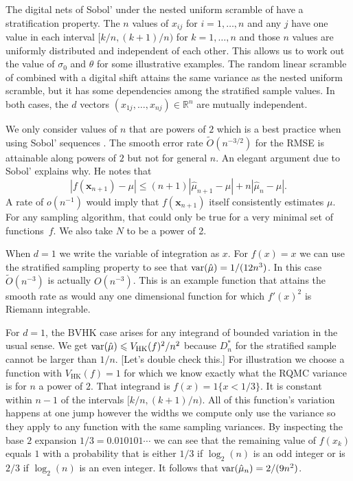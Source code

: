 \documentclass{article}
\newcommand{\art}[1]{\begingroup\color{blue}#1\endgroup}
\renewcommand{\le}{\leqslant}
\newcommand{\real}{\mathbb{R}}
\newcommand{\bsx}{\boldsymbol{x}}
\newcommand{\hk}{\mathrm{HK}}
\begin{document}
The digital nets of Sobol' \cite{Sob67} under the nested
uniform scramble of \cite{Owe95} have a stratification
property.  The $n$ values of $x_{ij}$ for $i=1,\dots,n$
and any $j$ have one value in each interval $[k/n,(k+1)/n)$
for $k=1,\dots,n$ and those $n$ values are uniformly distributed
and independent of each other. This allows us to work out
the value of $\sigma_0$ and $\theta$ for some illustrative
examples.  The random linear scramble of \cite{Mat98} combined
with a digital shift attains the same variance as the nested
uniform scramble, but it has some dependencies among the stratified
sample values.  In both cases, the $d$ vectors $(x_{1j},
\dots,x_{nj})\in\real^n$ are mutually independent.

We only consider values of $n$ that are powers of $2$
which is a best practice when using Sobol' sequences \cite{Owe22a}.
The smooth error rate $\tilde O(n^{-3/2})$ for the RMSE
is attainable along powers of $2$
but not for general $n$. An elegant argument due
to Sobol' \cite{sobo:1998} explains why.
He notes that
$$
|f(\bsx_{n+1})-\mu|
\le (n+1)|\hat\mu_{n+1}-\mu|+n|\hat\mu_n-\mu|.
$$
A rate of $o(n^{-1})$ would imply that $f(\bsx_{n+1})$ itself
consistently estimates $\mu$. For any sampling
algorithm, that could only be true for a very minimal 
set of functions~$f$.
We also take $N$ to be a power of 2.

When $d=1$ we write the variable of integration as $x$.
For $f(x)=x$ we can use the stratified sampling property
to see that $\operatorname{var}(\hat\mu) = 1/(12n^3)$.
In this case $\tilde O(n^{-3})$ is actually $O(n^{-3})$.
This is an example function that attains the smooth
rate as would any one dimensional function for
which $f'(x)^2$ is Riemann integrable.

For $d=1$, the BVHK case arises for any integrand
of bounded variation in the usual sense.
We get $\var(\hat\mu)\le V_{\hk}(f)^2/n^2$
because $D_n^*$ for the stratified sample
cannot be larger than $1/n$. \art{[Let's double check this.]}
For illustration we choose a function with $V_{\hk}(f)=1$
for which we know exactly what the RQMC variance is
for $n$ a power of $2$.
That integrand is $f(x)=1\{x<1/3\}$.
It is constant within $n-1$ of the intervals $[k/n,(k+1)/n)$.
All of this function's variation happens at one jump
however the widths we compute only use the variance
so they apply to any function with the same sampling variances.
By inspecting the base $2$ expansion $1/3=0.010101\cdots$
we can see that the remaining value of $f(x_k)$ equals
$1$ with a probability that is either $1/3$ if $\log_2(n)$
is an odd integer or is $2/3$ if $\log_2(n)$ is an
even integer. It follows that
$\operatorname{var}(\hat\mu_n)=2/(9n^2)$.
\end{document}
